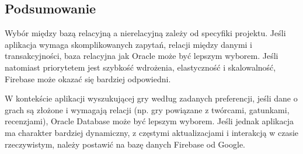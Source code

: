 \subsection{Podsumowanie}

Wybór między bazą relacyjną a nierelacyjną zależy od specyfiki projektu. Jeśli aplikacja wymaga skomplikowanych zapytań, relacji między danymi i transakcyjności, baza relacyjna jak Oracle może być lepszym wyborem. Jeśli natomiast priorytetem jest szybkość wdrożenia, elastyczność i skalowalność, Firebase może okazać się bardziej odpowiedni.

W kontekście aplikacji wyszukującej gry według zadanych preferencji, jeśli dane o grach są złożone i wymagają relacji (np. gry powiązane z twórcami, gatunkami, recenzjami), Oracle Database może być lepszym wyborem. Jeśli jednak aplikacja ma charakter bardziej dynamiczny, z częstymi aktualizacjami i interakcją w czasie rzeczywistym, należy postawić na bazę danych Firebase od Google.
